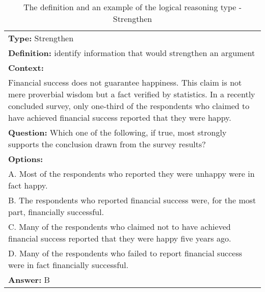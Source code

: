 \documentclass{article} \usepackage{iclr2020_conference,times}
\begin{document}
\begin{table}
	\small
	\centering
	\caption{The definition and an example of the logical reasoning type - Strengthen}
	\begin{tabular}{|p{}|}
		\hline
		{\bf Type: } Strengthen\\
		
		{\bf Definition: }identify information that would strengthen an argument\\
		\hline
\textbf{Context: }\\
Financial success does not guarantee happiness. This claim is not mere proverbial wisdom but a fact verified by statistics. In a recently concluded survey, only one-third of the respondents who claimed to have achieved financial success reported that they were happy.\\
\textbf{Question: }Which one of the following, if true, most strongly supports the conclusion drawn from the survey results?\\
\textbf{Options: }\\
A. Most of the respondents who reported they were unhappy were in fact happy.\\
B. The respondents who reported financial success were, for the most part, financially successful.\\
C. Many of the respondents who claimed not to have achieved financial success reported that they were happy five years ago.\\
D. Many of the respondents who failed to report financial success were in fact financially successful.\\
\textbf{Answer: } B \\
		\hline
	\end{tabular}
	\label{tab:strengthen}
\end{table}
\end{document}

